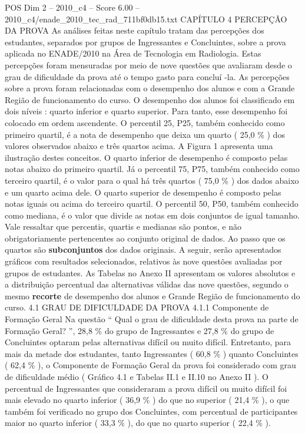 \begin{textsample}{POS Dim 2 – 2010\_c4 – Score 6.00 – 2010\_c4/enade\_2010\_tec\_rad\_711bf0db15.txt}  \label{ex:f2_pos_145}
CAPÍTULO 4 PERCEPÇÃO DA PROVA As análises feitas neste capítulo tratam das percepções dos estudantes, separados por grupos de Ingressantes e Concluintes, sobre a prova aplicada no ENADE/2010 na Área de Tecnologia em Radiologia.
Estas percepções foram mensuradas por meio de nove questões que avaliaram desde o grau de dificuldade da prova até o tempo gasto para concluí -la.
As percepções sobre a prova foram relacionadas com o desempenho dos alunos e com a Grande Região de funcionamento do curso.
O desempenho dos alunos foi classificado em dois níveis : quarto inferior e quarto superior.
Para tanto, esse desempenho foi colocado em ordem ascendente.
O percentil 25, P25, também conhecido como primeiro quartil, é a nota de desempenho que deixa um quarto ( 25,0 \% ) dos valores observados abaixo e três quartos acima.
A Figura 1 apresenta uma ilustração destes conceitos.
O quarto inferior de desempenho é composto pelas notas abaixo do primeiro quartil.
Já o percentil 75, P75, também conhecido como terceiro quartil, é o valor para o qual há três quartos ( 75,0 \% ) dos dados abaixo e um quarto acima dele.
O quarto superior de desempenho é composto pelas notas iguais ou acima do terceiro quartil.
O percentil 50, P50, também conhecido como mediana, é o valor que divide as notas em dois conjuntos de igual tamanho.
Vale ressaltar que percentis, quartis e medianas são pontos, e não obrigatoriamente pertencentes ao conjunto original de dados.
Ao passo que os quartos são \textbf{subconjuntos} dos dados originais.
A seguir, serão apresentados gráficos com resultados selecionados, relativos às nove questões avaliadas por grupos de estudantes.
As Tabelas no Anexo II apresentam os valores absolutos e a distribuição percentual das alternativas válidas das nove questões, segundo o mesmo \textbf{recorte} de desempenho dos alunos e Grande Região de funcionamento do curso. 4.1 GRAU DE DIFICULDADE DA PROVA 4.1.1 Componente de Formação Geral Na questão “ Qual o grau de dificuldade desta prova na parte de Formação Geral? ”, 28,8 \% do grupo de Ingressantes e 27,8 \% do grupo de Concluintes optaram pelas alternativas difícil ou muito difícil.
Entretanto, para mais da metade dos estudantes, tanto Ingressantes ( 60,8 \% ) quanto Concluintes ( 62,4 \% ), o Componente de Formação Geral da prova foi considerado com grau de dificuldade médio ( Gráfico 4.1 e Tabelas II.1 e II.10 no Anexo II ).
O percentual de Ingressantes que consideraram a prova difícil ou muito difícil foi mais elevado no quarto inferior ( 36,9 \% ) do que no superior ( 21,4 \% ), o que também foi verificado no grupo dos Concluintes, com percentual de participantes maior no quarto inferior ( 33,3 \% ), do que no quarto superior ( 22,4 \% ).

\end{textsample}
